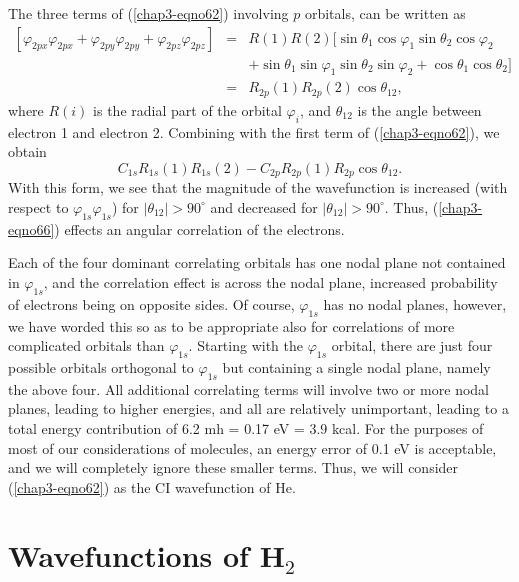 The three terms of (\ref{chap3-eqno62}) involving $p$ orbitals, can be
written as
\begin{eqnarray}
\left[ \varphi_{2px} \varphi_{2px} + \varphi_{2py} \varphi_{2py} + \varphi_{2pz} 
\varphi_{2pz} \right] &=& R(1)R(2) [\sin \theta_1 \cos \varphi_1 
\sin \theta_2 \cos \varphi_2 \\ \nonumber
 && + \sin \theta_1 \sin \varphi_1 \sin 
\theta_2 \sin \varphi_2 + \cos \theta_1 \cos \theta_2 ]\\
&=& R_{2p} (1) R_{2p} (2) \cos \theta_{12} ,
\end{eqnarray}
where $R(i)$ is the radial part of the orbital $\varphi_i$, and
$\theta_{12}$ is the angle between electron 1 and electron 2.
Combining with the first term of (\ref{chap3-eqno62}), we obtain
\begin{equation}
C_{1s} R_{1s} (1) R_{1s} (2) - C_{2p} R_{2p} (1) R_{2p} \cos 
\theta_{12} .
\label{chap3-eqno66}
\end{equation}
With this form, we see that the magnitude of the wavefunction is
increased (with respect to $\varphi_{1s} \varphi_{1s}$) for $|
\theta_{12} | > 90^{\circ}$ and decreased for $| \theta_{12} | >
90^{\circ}$.  Thus, (\ref{chap3-eqno66}) effects an angular
correlation of the electrons.

Each of the four dominant correlating orbitals has one nodal plane not
contained in $\varphi_{1s}$, and the correlation effect is across the
nodal plane, increased probability of electrons being on opposite
sides.  Of course, $\varphi_{1s}$ has no nodal planes, however, we
have worded this so as to be appropriate also for correlations of more
complicated orbitals than $\varphi_{1s}$.  Starting with the
$\varphi_{1s}$ orbital, there are just four possible orbitals
orthogonal to $\varphi_{1s}$ but containing a single nodal plane,
namely the above four.  All additional correlating terms will involve
two or more nodal planes, leading to higher energies, and all are
relatively unimportant, leading to a total energy contribution of 6.2
mh = 0.17 eV = 3.9 kcal.  For the purposes of most of our
considerations of molecules, an energy error of 0.1 eV is acceptable,
and we will completely ignore these smaller terms.  Thus, we will
consider (\ref{chap3-eqno62}) as the CI wavefunction of He.

\section{Wavefunctions of H$_2$}

